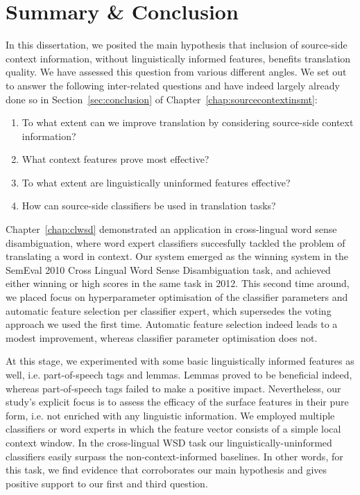 \chapter{Summary \& Conclusion}
\label{chap:conclusion}

In this dissertation, we posited the main hypothesis that inclusion of source-side context information, without
linguistically informed features, benefits translation quality. We have assessed this question from various different
angles. We set out to answer the following inter-related questions and have indeed largely already done so in
Section~\ref{sec:conclusion} of Chapter~\ref{chap:sourcecontextinsmt}:

\begin{enumerate}
\item To what extent can we improve translation by considering source-side
    context information?
\item What context features prove most effective?
\item To what extent are linguistically uninformed features effective?
\item How can source-side classifiers be used in translation tasks?
\end{enumerate}

Chapter~\ref{chap:clwsd} demonstrated an application in cross-lingual word sense
disambiguation, where word expert classifiers succesfully tackled the problem
of translating a word in context. Our system emerged as the winning system in
the SemEval 2010 Cross Lingual Word Sense Disambiguation task, and achieved
either winning or high scores in the same task in 2012. This second time
around, we placed focus on hyperparameter optimisation of the classifier
parameters and automatic feature selection per classifier expert, which
supersedes the voting approach we used the first time. Automatic feature
selection indeed leads to a modest improvement, whereas classifier parameter
optimisation does not.

At this stage, we experimented with some basic linguistically informed
features as well, i.e. part-of-speech tags and lemmas. Lemmas proved to be
beneficial indeed, whereas part-of-speech tags failed to make a positive
impact. Nevertheless, our study's explicit focus is to assess the efficacy of
the surface features in their pure form, i.e. not enriched with any linguistic
information. We employed multiple classifiers or word experts in which the
feature vector consists of a simple local context window. In the cross-lingual
WSD task our linguistically-uninformed classifiers easily surpass the
non-context-informed baselines. In other words, for this task, we find evidence that
corroborates our main hypothesis and gives positive support to our first and third question.

